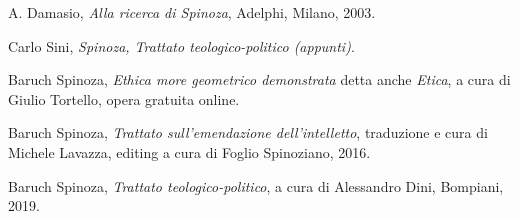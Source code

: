 \begin{thebibliography}{9}
	A. Damasio, \textit{Alla ricerca di Spinoza}, Adelphi, Milano, 2003.

	Carlo Sini, \textit{Spinoza, Trattato teologico-politico (appunti)}.

	Baruch Spinoza, \textit{Ethica more geometrico demonstrata} detta anche \textit{Etica}, a cura di Giulio Tortello, opera gratuita online.
	
	Baruch Spinoza, \textit{Trattato sull'emendazione dell'intelletto}, traduzione e cura di Michele Lavazza, editing a cura di Foglio Spinoziano, 2016.
	
	Baruch Spinoza, \textit{Trattato teologico-politico}, a cura di Alessandro Dini, Bompiani, 2019.

\end{thebibliography}
\newpage